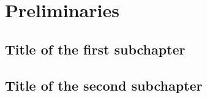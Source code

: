 \chapter{Preliminaries}

\section{Title of the first subchapter}

\section{Title of the second subchapter}
